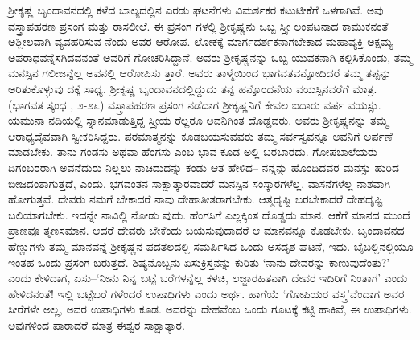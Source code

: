 ಶ್ರೀಕೃಷ್ಣ ಬೃಂದಾವನದಲ್ಲಿ ಕಳೆದ ಬಾಲ್ಯದಲ್ಲಿನ ಎರಡು ಘಟನೆಗಳು ವಿಮರ್ಶಕರ ಕಟುಟೀಕೆಗೆ ಒಳಗಾಗಿವೆ. ಅವು ವಸ್ತ್ರಾಪಹರಣ ಪ್ರಸಂಗ ಮತ್ತು ರಾಸಲೀಲೆ. ಈ ಪ್ರಸಂಗ ಗಳಲ್ಲಿ ಶ್ರೀಕೃಷ್ಣನು ಒಬ್ಬ ಸ್ತ್ರೀ ಲಂಪಟನಾದ ಕಾಮುಕನಂತೆ ಅಶ್ಲೀಲವಾಗಿ ವ್ಯವಹರಿಸುವ ನೆಂದು ಅವರ ಆರೋಪ. ಲೋಕಕ್ಕೆ ಮಾರ್ಗದರ್ಶಕನಾಗಬೇಕಾದ ಮಹಾವ್ಯಕ್ತಿ ಅಕ್ಷಮ್ಯ ಅಪರಾಧವನ್ನೆಸಗಿದವನಂತೆ ಅವರಿಗೆ ಗೋಚರಿಸಿದ್ದಾನೆ. ಅವರು ಶ್ರೀಕೃಷ್ಣನನ್ನು ಒಬ್ಬ ಯುವಕನಾಗಿ ಕಲ್ಪಿಸಿಕೊಂಡು, ತಮ್ಮ ಮನಸ್ಸಿನ ಗಲೀಜನ್ನೆಲ್ಲ ಅವನಲ್ಲಿ ಆರೋಪಿಸು ತ್ತಾರೆ. ಅವರು ತಾಳ್ಮೆಯಿಂದ ಭಾಗವತವನ್ನೋದಿದರೆ ತಮ್ಮ ತಪ್ಪನ್ನು ಅರಿತುಕೊಳ್ಳುವು ದಕ್ಕೆ ಸಾಧ್ಯ. ಶ್ರೀಕೃಷ್ಣ ಬೃಂದಾವನದಲ್ಲಿದ್ದುದು ತನ್ನ ಹನ್ನೊಂದನೆಯ ವಯಸ್ಸಿನವರೆಗೆ ಮಾತ್ರ. (ಭಾಗವತ ಸ್ಕಂಧ , ೨-೨೬) ವಸ್ತ್ರಾಪಹರಣ ಪ್ರಸಂಗ ನಡೆದಾಗ ಶ್ರೀಕೃಷ್ಣನಿಗೆ ಕೇವಲ ಐದಾರು ವರ್ಷ ವಯಸ್ಸು. ಯಮುನಾ ನದಿಯಲ್ಲಿ ಸ್ನಾನಮಾಡುತ್ತಿದ್ದ ಸ್ತ್ರೀಯ ರೆಲ್ಲರೂ ಅವನಿಗಿಂತ ದೊಡ್ಡವರು. ಅವರು ಶ್ರೀಕೃಷ್ಣನನ್ನು ತಮ್ಮ ಆರಾಧ್ಯದೈವವಾಗಿ ಸ್ವೀಕರಿಸಿದ್ದರು. ಪರಮಾತ್ಮನನ್ನು ಕೂಡಬಯಸುವವರು ತಮ್ಮ ಸರ್ವಸ್ವವನ್ನೂ ಅವನಿಗೆ ಅರ್ಪಣೆ ಮಾಡಬೇಕು. ತಾನು ಗಂಡಸು ಅಥವಾ ಹೆಂಗಸು ಎಂಬ ಭಾವ ಕೂಡ ಅಲ್ಲಿ ಬರಬಾರದು. ಗೋಪಬಾಲೆಯರು ದಿಗಂಬರರಾಗಿ ಅವನೆದುರು ನಿಲ್ಲಲು ನಾಚಿದುದನ್ನು ಕಂಡು ಆತ ಹೇಳಿದ– ನನ್ನನ್ನು ಹೊಂದಿದವರ ಮನಸ್ಸು ಹುರಿದ ಬೀಜದಂತಾಗುತ್ತದೆ, ಎಂದು. ಭಗವಂತನ ಸಾಕ್ಷಾತ್ಕಾರವಾದರೆ ಮನಸ್ಸಿನ ಸಂಸ್ಕಾರಗಳೆಲ್ಲ, ವಾಸನೆಗಳೆಲ್ಲ ನಾಶವಾಗಿ ಹೋಗುತ್ತವೆ. ದೇವರು ನಮಗೆ ಬೇಕಾದರೆ ನಾವು ದೇಹಾತೀತರಾಗಬೇಕು. ಆತ್ಮದೃಷ್ಟಿ ಬರಬೇಕಾದರೆ ದೇಹದೃಷ್ಟಿ ಬಲಿಯಾಗಬೇಕು. ಇದನ್ನೇ ನಾವಿಲ್ಲಿ ನೋಡು ವುದು. ಹೆಂಗಸಿಗೆ ಎಲ್ಲಕ್ಕಿಂತ ದೊಡ್ಡದು ಮಾನ. ಆಕೆಗೆ ಮಾನದ ಮುಂದೆ ಪ್ರಾಣವೂ ತೃಣಸಮಾನ. ಆದರೆ ದೇವರು ಬೇಕೆಂದು ಬಯಸುವುದಾದರೆ ಆ ಮಾನವನ್ನೂ ಕೊಡಬೇಕು. ಬೃಂದಾವನದ ಹೆಣ್ಣುಗಳು ತಮ್ಮ ಮಾನವನ್ನೆ ಶ್ರೀಕೃಷ್ಣನ ಪದತಲದಲ್ಲಿ ಸಮರ್ಪಿಸಿದ ಒಂದು ಅಸದೃಶ ಘಟನೆ, ಇದು. ಬೈಬಲ್ಲಿನಲ್ಲಿಯೂ ಇಂತಹ ಒಂದು ಪ್ರಸಂಗ ಬರುತ್ತದೆ. ಶಿಷ್ಯನೊಬ್ಬನು ಏಸುಕ್ರಿಸ್ತನನ್ನು ಕುರಿತು ‘ನಾನು ದೇವರನ್ನು ಕಾಣುವುದೆಂತು?’ ಎಂದು ಕೇಳಿದಾಗ, ಏಸು–‘ನೀನು ನಿನ್ನ ಬಟ್ಟೆ ಬರೆಗಳನ್ನೆಲ್ಲ ಕಳಚಿ, ಲಜ್ಜಾರಹಿತನಾಗಿ ದೇವರ ಇದಿರಿಗೆ ನಿಂತಾಗ’ ಎಂದು ಹೇಳಿದನಂತೆ! ಇಲ್ಲಿ ಬಟ್ಟೆಬರೆ ಗಳೆಂದರೆ ಉಪಾಧಿಗಳು ಎಂದು ಅರ್ಥ. ಹಾಗೆಯೆ ‘ಗೋಪಿಯರ ವಸ್ತ್ರ’ವೆಂದಾಗ ಅವರ ಸೀರೆಗಳೇ ಅಲ್ಲ, ಅವರ ಉಪಾಧಿಗಳು ಕೂಡ. ಅವರನ್ನು ದೇಹವೆಂಬ ಒಂದು ಗೂಟಕ್ಕೆ ಕಟ್ಟಿ ಹಾಕಿವೆ, ಈ ಉಪಾಧಿಗಳು. ಅವುಗಳಿಂದ ಪಾರಾದರೆ ಮಾತ್ರ ಈಶ್ವರ ಸಾಕ್ಷಾತ್ಕಾರ.

